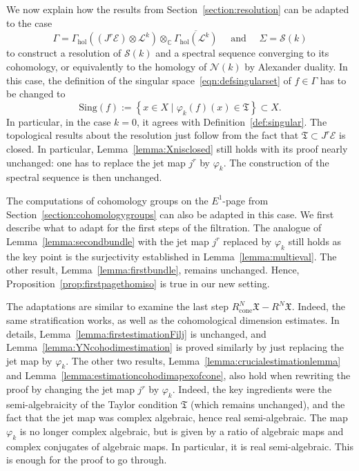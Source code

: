 \documentclass[a4paper]{amsart}
\newcommand{\bC}{\mathbb C}
\newcommand{\cE}{\mathcal E}
\newcommand{\cS}{\mathcal S}
\newcommand{\cN}{\mathcal N}
\newcommand{\cL}{\mathcal L}
\newcommand{\fX}{\mathfrak X}
\newcommand{\fT}{\mathfrak T}
\theoremstyle{plain}
\theoremstyle{definition}
\newcommand{\Gammahol}{\Gamma_{\mathrm{hol}}}
\begin{document}
We now explain how the results from Section~\ref{section:resolution} can be adapted to the case
\[
    \Gamma = \Gammahol\left( (J^r\cE) \otimes \cL^k \right) \otimes_\bC \overline{\Gammahol\left(\cL^k \right)} \quad \text{ and } \quad \Sigma = \cS(k)
\]
to construct a resolution of $\cS(k)$ and a spectral sequence converging to its cohomology, or equivalently to the homology of $\cN(k)$ by Alexander duality. In this case, the definition of the singular space~\eqref{eqn:defsingularset} of $f \in \Gamma$ has to be changed to 
\[
    \mathrm{Sing}(f) := \left\{ x \in X \mid \varphi_k(f)(x) \in \fT \right\} \subset X.
\]
In particular, in the case $k=0$, it agrees with Definition~\ref{def:singular}. The topological results about the resolution just follow from the fact that $\fT \subset J^r\cE$ is closed. In particular, Lemma~\ref{lemma:Xnisclosed} still holds with its proof nearly unchanged: one has to replace the jet map $j^r$ by $\varphi_k$. The construction of the spectral sequence is then unchanged.

\bigskip


The computations of cohomology groups on the $E^1$-page from Section~\ref{section:cohomologygroups} can also be adapted in this case. We first describe what to adapt for the first steps of the filtration. The analogue of Lemma~\ref{lemma:secondbundle} with the jet map $j^r$ replaced by $\varphi_k$ still holds as the key point is the surjectivity established in Lemma~\ref{lemma:multieval}. The other result, Lemma~\ref{lemma:firstbundle}, remains unchanged. Hence, Proposition~\ref{prop:firstpagethomiso} is true in our new setting. 

The adaptations are similar to examine the last step $R^N_\text{cone}\fX - R^N\fX$. Indeed, the same stratification works, as well as the cohomological dimension estimates. In details, Lemma~\ref{lemma:firstestimationFilj} is unchanged, and Lemma~\ref{lemma:YNcohodimestimation} is proved similarly by just replacing the jet map by $\varphi_k$. The other two results, Lemma~\ref{lemma:crucialestimationlemma} and Lemma~\ref{lemma:estimationcohodimapexofcone}, also hold when rewriting the proof by changing the jet map $j^r$ by $\varphi_k$. Indeed, the key ingredients were the semi-algebraicity of the Taylor condition $\fT$ (which remains unchanged), and the fact that the jet map was complex algebraic, hence real semi-algebraic. The map $\varphi_k$ is no longer complex algebraic, but is given by a ratio of algebraic maps and complex conjugates of algebraic maps. In particular, it is real semi-algebraic. This is enough for the proof to go through.
\end{document}
